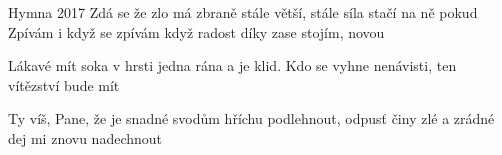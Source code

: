 \begin{TEXT}{Hymna 2017}
\SLOKA Zdá se  že zlo má zbraně \NL
stále větší, stále  \NL
síla  stačí na ně \NL
pokud  
\REFREN  Zpívám  i když  se \NL
         zpívám  když radost \NL
         díky  zase stojím, \NL
         novou  

\SLOKA Lákavé mít soka v hrsti \NL
jedna rána a je klid.\NL
Kdo se vyhne nenávisti, \NL
ten vítězství bude mít

\SLOKA Ty víš, Pane, že je snadné\NL
svodům hříchu podlehnout,\NL
odpusť činy zlé a zrádné \NL
dej mi znovu nadechnout
\end{TEXT}
